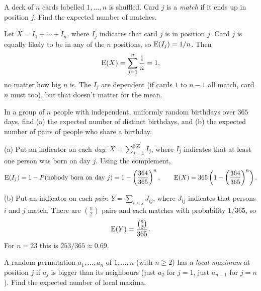 \bigskip

\begin{example}\label{ex:matching}
A deck of $n$ cards labelled $1, \dots, n$ is shuffled. Card $j$ is a \emph{match} if it ends up in position $j$. Find the expected number of matches.
\end{example}

\medskip

\begin{solution}
Let $X = I_1 + \cdots + I_n$, where $I_j$ indicates that card $j$ is in position $j$. Card $j$ is equally likely to be in any of the $n$ positions, so $\operatorname{E}(I_j) = 1/n$. Then
\medskip
\[
\operatorname{E}(X) = \sum_{j=1}^{n} \frac{1}{n} = 1,
\]
\medskip
no matter how big $n$ is. The $I_j$ are dependent (if cards $1$ to $n-1$ all match, card $n$ must too), but that doesn't matter for the mean.
\end{solution}

\bigskip

\begin{example}\label{ex:birthdays}
In a group of $n$ people with independent, uniformly random birthdays over $365$ days, find (a) the expected number of distinct birthdays, and (b) the expected number of pairs of people who share a birthday.
\end{example}

\medskip

\begin{solution}
(a) Put an indicator on each \emph{day}: $X = \sum_{j=1}^{365} I_j$, where $I_j$ indicates that at least one person was born on day $j$. Using the complement,
\medskip
\[
\operatorname{E}(I_j) = 1 - P(\text{nobody born on day } j) = 1 - \left(\frac{364}{365}\right)^{n},
\qquad
\operatorname{E}(X) = 365\left(1 - \left(\frac{364}{365}\right)^{n}\right).
\]
\bigskip

(b) Put an indicator on each \emph{pair}: $Y = \sum_{i < j} J_{ij}$, where $J_{ij}$ indicates that persons $i$ and $j$ match. There are $\binom{n}{2}$ pairs and each matches with probability $1/365$, so
\medskip
\[
\operatorname{E}(Y) = \frac{\binom{n}{2}}{365}.
\]
\medskip
For $n = 23$ this is $253/365 \approx 0.69$.
\end{solution}

\bigskip

\begin{example}\label{ex:localmax}
A random permutation $a_1, \dots, a_n$ of $1, \dots, n$ (with $n \ge 2$) has a \emph{local maximum} at position $j$ if $a_j$ is bigger than its neighbours (just $a_2$ for $j = 1$, just $a_{n-1}$ for $j = n$). Find the expected number of local maxima.
\end{example}

